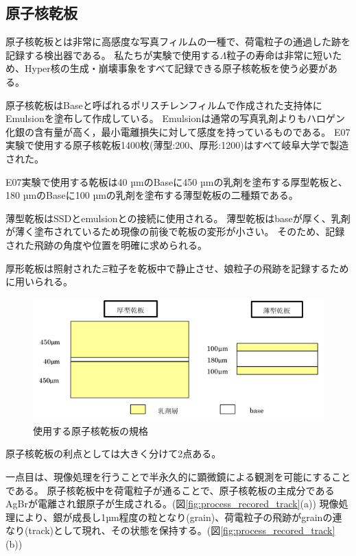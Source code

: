 \documentclass[12pt,a4paper]{jarticle}
\begin{document}
\subsection{原子核乾板}
原子核乾板とは非常に高感度な写真フィルムの一種で、荷電粒子の通過した跡を記録する検出器である。
私たちが実験で使用する$\Lambda$粒子の寿命は非常に短いため、Hyper核の生成・崩壊事象をすべて記録できる原子核乾板を使う必要がある。
\par
原子核乾板はBaseと呼ばれるポリスチレンフィルムで作成された支持体にEmulsionを塗布して作成している。
Emulsionは通常の写真乳剤よりもハロゲン化銀の含有量が高く，最小電離損失に対して感度を持っているものである。
E07実験で使用する原子核乾板1400枚(薄型:200、厚形:1200)はすべて岐阜大学で製造された。
\par
E07実験で使用する乾板は40 µmのBaseに450 µmの乳剤を塗布する厚型乾板と、180 µmのBaseに100 µmの乳剤を塗布する薄型乾板の二種類である。
\par
薄型乾板はSSDとemulsionとの接続に使用される。
薄型乾板はbaseが厚く、乳剤が薄く塗布されているため現像の前後で乾板の変形が小さい。
そのため、記録された飛跡の角度や位置を明確に求められる。
\par
厚形乾板は照射された$\Xi$粒子を乾板中で静止させ、娘粒子の飛跡を記録するために用いられる。
\par
\begin{figure}[htbp]
  \centering
     \includegraphics[width=140mm]{emulsionorder.png}
  \caption{使用する原子核乾板の規格\label{fig:emulsionorder}}
\end{figure}
\par
原子核乾板の利点としては大きく分けて2点ある。
\par
一点目は、現像処理を行うことで半永久的に顕微鏡による観測を可能にすることである。
原子核乾板中を荷電粒子が通ることで、原子核乾板の主成分であるAgBrが電離され銀原子が生成される。(図\ref{fig:process_recored_track}(a))
現像処理により、銀が成長し1µm程度の粒となり(grain)、荷電粒子の飛跡がgrainの連なり(track)として現れ、その状態を保持する。(図\ref{fig:process_recored_track}(b))
\end{document}
